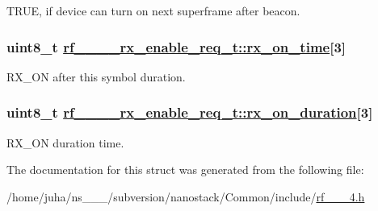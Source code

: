 TRUE, if device can turn on next superframe after beacon. \hypertarget{structrf__802__15__4__rx__enable__req__t_4d952ca97d8eb8df58e535c9e76b0c67}{
\subsubsection[rx\_\-on\_\-time]{\setlength{\rightskip}{0pt plus 5cm}uint8\_\-t \hyperlink{structrf__802__15__4__rx__enable__req__t_4d952ca97d8eb8df58e535c9e76b0c67}{rf\_\_\_\_\-rx\_\-enable\_\-req\_\-t::rx\_\-on\_\-time}\mbox{[}3\mbox{]}}}
\label{structrf__802__15__4__rx__enable__req__t_4d952ca97d8eb8df58e535c9e76b0c67}


RX\_\-ON after this symbol duration. \hypertarget{structrf__802__15__4__rx__enable__req__t_bd360feb833cebf250df3569133ed945}{
\subsubsection[rx\_\-on\_\-duration]{\setlength{\rightskip}{0pt plus 5cm}uint8\_\-t \hyperlink{structrf__802__15__4__rx__enable__req__t_bd360feb833cebf250df3569133ed945}{rf\_\_\_\_\-rx\_\-enable\_\-req\_\-t::rx\_\-on\_\-duration}\mbox{[}3\mbox{]}}}
\label{structrf__802__15__4__rx__enable__req__t_bd360feb833cebf250df3569133ed945}


RX\_\-ON duration time. 

The documentation for this struct was generated from the following file:\begin{CompactItemize}
\item 
/home/juha/ns\_\_\_/subversion/nanostack/Common/include/\hyperlink{rf__802__15__4_8h}{rf\_\_\_\-4.h}\end{CompactItemize}

